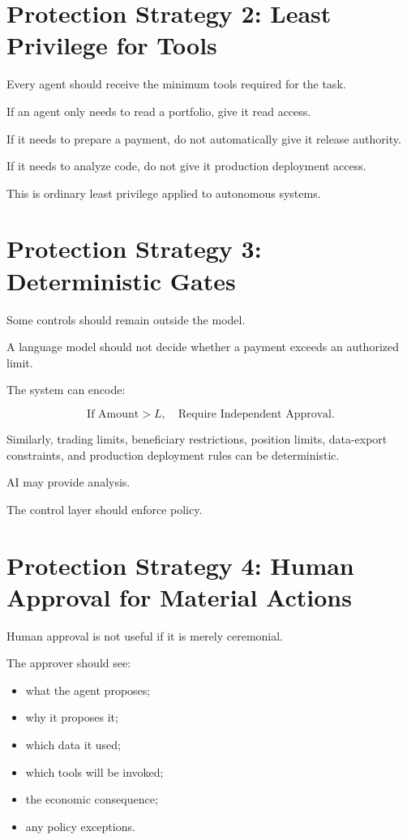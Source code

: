 \section{Protection Strategy 2: Least Privilege for Tools}

Every agent should receive the minimum tools required for the task.

If an agent only needs to read a portfolio, give it read access.

If it needs to prepare a payment, do not automatically give it release authority.

If it needs to analyze code, do not give it production deployment access.

This is ordinary least privilege applied to autonomous systems.

\section{Protection Strategy 3: Deterministic Gates}

Some controls should remain outside the model.

A language model should not decide whether a payment exceeds an authorized limit.

The system can encode:

\begin{equation}
\text{If Amount} > L,
\quad
\text{Require Independent Approval}.
\end{equation}

Similarly, trading limits, beneficiary restrictions, position limits, data-export constraints, and production deployment rules can be deterministic.

AI may provide analysis.

The control layer should enforce policy.

\section{Protection Strategy 4: Human Approval for Material Actions}

Human approval is not useful if it is merely ceremonial.

The approver should see:

\begin{itemize}
    \item what the agent proposes;
    \item why it proposes it;
    \item which data it used;
    \item which tools will be invoked;
    \item the economic consequence;
    \item any policy exceptions.
\end{itemize}


